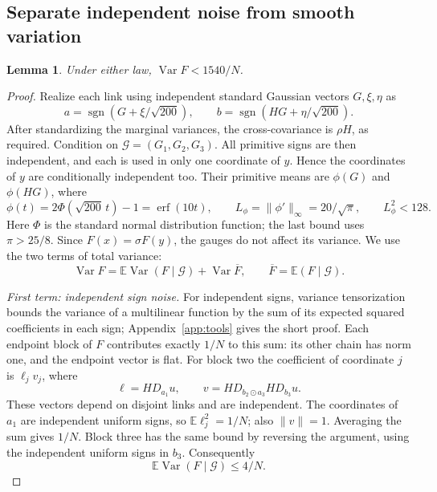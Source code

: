 \documentclass[11pt]{article}
\newtheorem{lemma}[theorem]{Lemma}
\newcommand{\E}{\mathbb E}
\newcommand{\Var}{\operatorname{Var}}
\newcommand{\sgn}{\operatorname{sgn}}
\newcommand{\1}{\mathbf 1}
\begin{document}
\subsection{Separate independent noise from smooth variation}
\begin{lemma}\label{lem:variance}
Under either law, $\Var F<1540/N$.
\end{lemma}
\begin{proof}
Realize each link using independent standard Gaussian vectors
$G,\xi,\eta$ as
\[
 a=\sgn(G+\xi/\sqrt{200}),\qquad
 b=\sgn(HG+\eta/\sqrt{200}).
\]
After standardizing the marginal variances, the cross-covariance is
$\rho H$, as required. Condition on $\mathcal G=(G_1,G_2,G_3)$.
All primitive signs are then independent, and each is used in only
one coordinate of $y$. Hence the coordinates of $y$ are conditionally
independent too. Their primitive means are $\phi(G)$ and $\phi(HG)$,
where
\[
 \phi(t)=2\Phi(\sqrt{200}\,t)-1=\operatorname{erf}(10t),\qquad
 L_\phi=\|\phi'\|_\infty=20/\sqrt\pi,\qquad L_\phi^2<128.
\]
Here $\Phi$ is the standard normal distribution function; the last
bound uses $\pi>25/8$. Since $F(x)=\sigma F(y)$, the gauges do not
affect its variance. We use the two terms of total variance:
\begin{equation}\label{eq:total-variance}
 \Var F=\E\Var(F\mid\mathcal G)+\Var\overline F,\qquad
 \overline F=\E(F\mid\mathcal G).
\end{equation}

\emph{First term: independent sign noise.}
For independent signs, variance tensorization bounds the variance of
a multilinear function by the sum of its expected squared coefficients
in each sign; Appendix~\ref{app:tools} gives the short proof.
Each endpoint block of $F$ contributes exactly $1/N$ to this sum:
its other chain has norm one, and the endpoint vector is flat.
For block two the coefficient of coordinate $j$ is $\ell_jv_j$, where
\[
 \ell=HD_{a_1}u,\qquad v=HD_{b_2\odot a_3}HD_{b_3}u.
\]
These vectors depend on disjoint links and are independent.
The coordinates of $a_1$ are independent uniform signs, so
$\E\ell_j^2=1/N$; also $\|v\|=1$. Averaging the sum gives $1/N$.
Block three has the same bound by reversing the argument, using the
independent uniform signs in $b_3$. Consequently
\begin{equation}\label{eq:noise-var}
                         \E\Var(F\mid\mathcal G)\le4/N.
\end{equation}


\end{proof}
\end{document}
